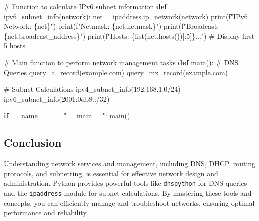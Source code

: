 \documentclass[
  letterpaper,
  DIV=11,
  numbers=noendperiod]{scrreprt}
\newenvironment{Shaded}{\begin{snugshade}}{\end{snugshade}}
\newcommand{\BuiltInTok}[1]{\textcolor[rgb]{0.00,0.23,0.31}{#1}}
\newcommand{\CommentTok}[1]{\textcolor[rgb]{0.37,0.37,0.37}{#1}}
\newcommand{\ControlFlowTok}[1]{\textcolor[rgb]{0.00,0.23,0.31}{\textbf{#1}}}
\newcommand{\DecValTok}[1]{\textcolor[rgb]{0.68,0.00,0.00}{#1}}
\newcommand{\KeywordTok}[1]{\textcolor[rgb]{0.00,0.23,0.31}{\textbf{#1}}}
\newcommand{\NormalTok}[1]{\textcolor[rgb]{0.00,0.23,0.31}{#1}}
\newcommand{\OperatorTok}[1]{\textcolor[rgb]{0.37,0.37,0.37}{#1}}
\newcommand{\SpecialCharTok}[1]{\textcolor[rgb]{0.37,0.37,0.37}{#1}}
\newcommand{\SpecialStringTok}[1]{\textcolor[rgb]{0.13,0.47,0.30}{#1}}
\newcommand{\StringTok}[1]{\textcolor[rgb]{0.13,0.47,0.30}{#1}}
\newcommand{\VariableTok}[1]{\textcolor[rgb]{0.07,0.07,0.07}{#1}}
\begin{document}
\begin{Shaded}
\begin{Highlighting}[]
\CommentTok{\# Function to calculate IPv6 subnet information}
\KeywordTok{def}\NormalTok{ ipv6\_subnet\_info(network):}
\NormalTok{    net }\OperatorTok{=}\NormalTok{ ipaddress.ip\_network(network)}
    \BuiltInTok{print}\NormalTok{(}\SpecialStringTok{f"IPv6 Network: }\SpecialCharTok{\{}\NormalTok{net}\SpecialCharTok{\}}\SpecialStringTok{"}\NormalTok{)}
    \BuiltInTok{print}\NormalTok{(}\SpecialStringTok{f"Netmask: }\SpecialCharTok{\{}\NormalTok{net}\SpecialCharTok{.}\NormalTok{netmask}\SpecialCharTok{\}}\SpecialStringTok{"}\NormalTok{)}
    \BuiltInTok{print}\NormalTok{(}\SpecialStringTok{f"Broadcast: }\SpecialCharTok{\{}\NormalTok{net}\SpecialCharTok{.}\NormalTok{broadcast\_address}\SpecialCharTok{\}}\SpecialStringTok{"}\NormalTok{)}
    \BuiltInTok{print}\NormalTok{(}\SpecialStringTok{f"Hosts: }\SpecialCharTok{\{}\BuiltInTok{list}\NormalTok{(net.hosts())[:}\DecValTok{5}\NormalTok{]}\SpecialCharTok{\}}\SpecialStringTok{..."}\NormalTok{)  }\CommentTok{\# Display first 5 hosts}

\CommentTok{\# Main function to perform network management tasks}
\KeywordTok{def}\NormalTok{ main():}
    \CommentTok{\# DNS Queries}
\NormalTok{    query\_a\_record(}\StringTok{\textquotesingle{}example.com\textquotesingle{}}\NormalTok{)}
\NormalTok{    query\_mx\_record(}\StringTok{\textquotesingle{}example.com\textquotesingle{}}\NormalTok{)}

    \CommentTok{\# Subnet Calculations}
\NormalTok{    ipv4\_subnet\_info(}\StringTok{\textquotesingle{}192.168.1.0/24\textquotesingle{}}\NormalTok{)}
\NormalTok{    ipv6\_subnet\_info(}\StringTok{\textquotesingle{}2001:0db8::/32\textquotesingle{}}\NormalTok{)}

\ControlFlowTok{if} \VariableTok{\_\_name\_\_} \OperatorTok{==} \StringTok{"\_\_main\_\_"}\NormalTok{:}
\NormalTok{    main()}
\end{Highlighting}
\end{Shaded}

\subsection{Conclusion}\label{conclusion-46}

Understanding network services and management, including DNS, DHCP,
routing protocols, and subnetting, is essential for effective network
design and administration. Python provides powerful tools like
\texttt{dnspython} for DNS queries and the \texttt{ipaddress} module for
subnet calculations. By mastering these tools and concepts, you can
efficiently manage and troubleshoot networks, ensuring optimal
performance and reliability.
\end{document}
